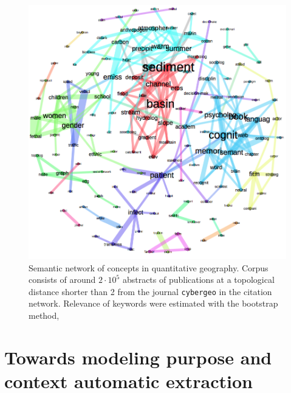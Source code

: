 \begin{figure}
\hspace{-4cm}
\includegraphics[width=1.4\textwidth]{Figures/PartI/QuantitativeEpistemo/HyperNetwork/all_lesslinks}
\caption[Semantic network of concepts in quantitative geography]{Semantic network of concepts in quantitative geography. Corpus consists of around $2\cdot 10^5$ abstracts of publications at a topological distance shorter than 2 from the journal \texttt{cybergeo} in the citation network. Relevance of keywords were estimated with the bootstrap method, }
\label{fig:quantepistemo:semanticnw}
\end{figure}








\newpage



\section{Towards modeling purpose and context automatic extraction}


